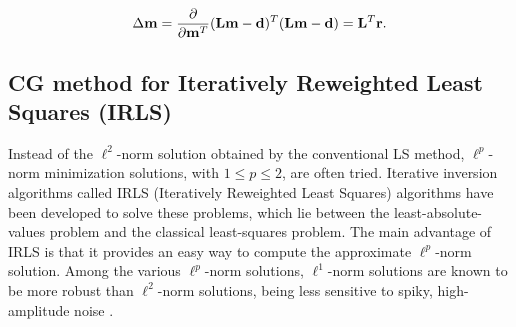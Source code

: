 \begin{equation}
\Delta \mathbf m = 
{\partial \over \partial \mathbf m^T }
(\mathbf L\mathbf m -\mathbf d)^T(\mathbf L\mathbf m -\mathbf d)
= \mathbf L^T\mathbf r  .
\end{equation}

\subsection{CG method for Iteratively Reweighted Least Squares (IRLS)}

Instead of the $\ell^2$-norm solution obtained by the conventional LS method, 
$\ell^p$-norm minimization solutions, with $1\le p \le2$, are often tried. 
Iterative inversion algorithms called IRLS 
(Iteratively Reweighted Least Squares) 
algorithms have been developed to solve these problems, which lie
between the least-absolute-values problem and the classical least-squares problem.
The main advantage of IRLS is that it provides an easy way to compute 
the approximate $\ell^p$-norm solution.
Among the various $\ell^p$-norm solutions, 
$\ell^1$-norm solutions are known to be more robust than $\ell^2$-norm solutions, 
being less sensitive to spiky, high-amplitude noise 
\cite{GEO38-05-08260844,GEO44-01-00390052,GIT00-00-00250050,SEG-1988-S7.1}.

